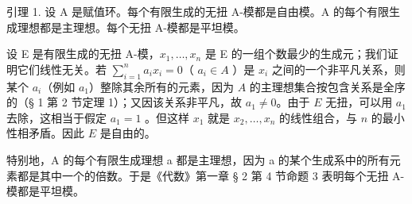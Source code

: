 引理 1. 设 A 是赋值环。每个有限生成的无扭 A-模都是自由模。A 的每个有限生成理想都是主理想。每个无扭 A-模都是平坦模。

设 E 是有限生成的无扭 A-模，\(x_{1}, \ldots, x_{n}\) 是 E 的一组个数最少的生成元；我们证明它们线性无关。若 \(\sum_{i=1}^{n} a_i x_i = 0\)（ \(a_i \in A\) ）是 \(x_i\) 之间的一个非平凡关系，则某个 \(a_i\)（例如 \(a_1\)）整除其余所有的元素，因为 \(A\) 的主理想集合按包含关系是全序的（§ 1 第 2 节定理 1）；又因该关系非平凡，故 \(a_1 \neq 0\)。由于 \(E\) 无扭，可以用 \(a_1\) 去除，这相当于假定 \(a_1 = 1\) 。但这样 \(x_1\) 就是 \(x_2, \ldots, x_n\) 的线性组合，与 \(n\) 的最小性相矛盾。因此 \(E\) 是自由的。

特别地，A 的每个有限生成理想 a 都是主理想，因为 a 的某个生成系中的所有元素都是其中一个的倍数。于是《代数》第一章 § 2 第 4 节命题 3 表明每个无扭 A-模都是平坦模。

